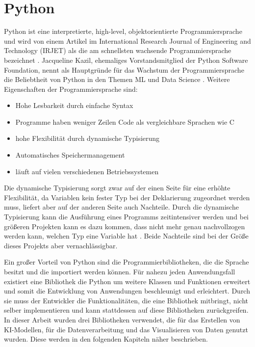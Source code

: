 \section{Python}
\label{chap:Python}

Python ist eine interpretierte, high-level, objektorientierte Programmiersprache und wird von einem Artikel 
im International Research Journal of Engineering and Technology (IRJET) als die am schnellsten wachsende Programmiersprache 
bezeichnet \cite[vgl. S.354]{Python}. Jacqueline Kazil, ehemaliges Vorstandsmitglied der Python Software Foundation,
nennt als Hauptgründe für das Wachstum der Programmiersprache die Beliebtheit von Python in den Themen \ac{ML} und Data Science \cite[vgl. S.354]{Python}.
Weitere Eigenschaften der Programmiersprache sind:
\begin{itemize}
    \item Hohe Lesbarkeit durch einfache Syntax \cite[vgl. S.354]{Python}
    \item Programme haben weniger Zeilen Code als vergleichbare Sprachen wie C \cite[vgl. S.354]{Python}
    \item hohe Flexibilität durch dynamische Typisierung \cite[vgl. S.354]{Python}
    \item Automatisches Speichermanagement \cite[vgl. S.354]{Python}
    \item läuft auf vielen verschiedenen Betriebssystemen \cite[vgl. S.355]{Python}
\end{itemize}
Die dynamische Typisierung sorgt zwar auf der einen Seite für eine erhöhte Flexibilität, da Variablen kein fester Typ bei der Deklarierung zugeordnet werden muss,
liefert aber auf der anderen Seite auch Nachteile. Durch die dynamische Typisierung kann die Ausführung eines Programms zeitintensiver werden und bei größeren 
Projekten kann es dazu kommen, dass nicht mehr genau nachvollzogen werden kann, welchen Typ eine Variable hat \cite[vgl. S.355]{Python}. Beide Nachteile sind bei der Größe
dieses Projekts aber vernachlässigbar. 

Ein großer Vorteil von Python sind die Programmierbibliotheken, die die Sprache besitzt und die importiert werden können. Für nahezu jeden Anwendungsfall existiert eine 
Bibliothek die Python um weitere Klassen und Funktionen erweitert und somit die Entwicklung von Anwendungen beschleunigt und erleichtert. Durch sie muss 
der Entwickler die Funktionalitäten, die eine Bibliothek mitbringt, nicht selber implementieren und kann stattdessen auf diese Bibliotheken zurückgreifen. 
In dieser Arbeit wurden drei Bibliotheken verwendet, die für das Erstellen von \ac{KI}-Modellen, für die Datenverarbeitung und das Visualisieren von Daten
genutzt wurden. Diese werden in den folgenden Kapiteln näher beschrieben.

